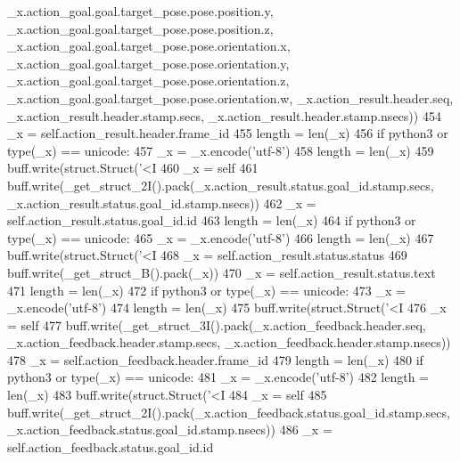 \begin{DoxyCode}
{{{      \_x.action\_goal.goal.target\_pose.pose.position.y, \_x.action\_goal.goal.target\_pose.pose.position.z, 
      \_x.action\_goal.goal.target\_pose.pose.orientation.x, \_x.action\_goal.goal.target\_pose.pose.orientation.y, 
      \_x.action\_goal.goal.target\_pose.pose.orientation.z, \_x.action\_goal.goal.target\_pose.pose.orientation.w, \_x.action\_result.header.seq, 
      \_x.action\_result.header.stamp.secs, \_x.action\_result.header.stamp.nsecs))
454       \_x = self.action\_result.header.frame\_id
455       length = len(\_x)
456       \textcolor{keywordflow}{if} python3 \textcolor{keywordflow}{or} type(\_x) == unicode:
457         \_x = \_x.encode(\textcolor{stringliteral}{'utf-8'})
458         length = len(\_x)
459       buff.write(struct.Struct(\textcolor{stringliteral}{'<I%
460       \_x = self
461       buff.write(\_get\_struct\_2I().pack(\_x.action\_result.status.goal\_id.stamp.secs, 
      \_x.action\_result.status.goal\_id.stamp.nsecs))
462       \_x = self.action\_result.status.goal\_id.id
463       length = len(\_x)
464       \textcolor{keywordflow}{if} python3 \textcolor{keywordflow}{or} type(\_x) == unicode:
465         \_x = \_x.encode(\textcolor{stringliteral}{'utf-8'})
466         length = len(\_x)
467       buff.write(struct.Struct(\textcolor{stringliteral}{'<I%
468       \_x = self.action\_result.status.status
469       buff.write(\_get\_struct\_B().pack(\_x))
470       \_x = self.action\_result.status.text
471       length = len(\_x)
472       \textcolor{keywordflow}{if} python3 \textcolor{keywordflow}{or} type(\_x) == unicode:
473         \_x = \_x.encode(\textcolor{stringliteral}{'utf-8'})
474         length = len(\_x)
475       buff.write(struct.Struct(\textcolor{stringliteral}{'<I%
476       \_x = self
477       buff.write(\_get\_struct\_3I().pack(\_x.action\_feedback.header.seq, \_x.action\_feedback.header.stamp.secs,
       \_x.action\_feedback.header.stamp.nsecs))
478       \_x = self.action\_feedback.header.frame\_id
479       length = len(\_x)
480       \textcolor{keywordflow}{if} python3 \textcolor{keywordflow}{or} type(\_x) == unicode:
481         \_x = \_x.encode(\textcolor{stringliteral}{'utf-8'})
482         length = len(\_x)
483       buff.write(struct.Struct(\textcolor{stringliteral}{'<I%
484       \_x = self
485       buff.write(\_get\_struct\_2I().pack(\_x.action\_feedback.status.goal\_id.stamp.secs, 
      \_x.action\_feedback.status.goal\_id.stamp.nsecs))
486       \_x = self.action\_feedback.status.goal\_id.id
}}}}}}}
\end{DoxyCode}
